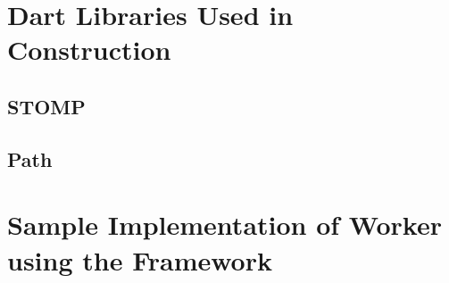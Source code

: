 \section{Dart Libraries Used in Construction}
  \subsection{STOMP}
  \subsection{Path}
  \subsection{}

\section{Sample Implementation of Worker using the Framework}
